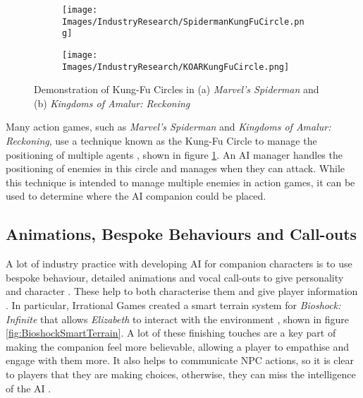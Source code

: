 \documentclass{IEEEtran}
\begin{document}
\begin{figure}
  \centering
  
  \begin{subfigure}[a]{\linewidth}
  \texttt{[image: Images/IndustryResearch/SpidermanKungFuCircle.png]}
  \end{subfigure}
  
  \begin{subfigure}[b]{\linewidth}
  \texttt{[image: Images/IndustryResearch/KOARKungFuCircle.png]}
  \end{subfigure}
  
  \caption{Demonstration of Kung-Fu Circles in (a) \textit{Marvel's Spiderman} and (b) \textit{Kingdoms of Amalur: Reckoning}}
  \label{fig:KungFuCircle}
\end{figure}

Many action games, such as \textit{Marvel's Spiderman} and \textit{Kingdoms of Amalur: Reckoning}, use a technique known as the Kung-Fu Circle to manage the positioning of multiple agents \cite{GAIPKungFuCircle, GDCSpiderman}, shown in figure \ref{fig:KungFuCircle}. An AI manager handles the positioning of enemies in this circle and manages when they can attack. While this technique is intended to manage multiple enemies in action games, it can be used to determine where the AI companion could be placed.

\subsection{Animations, Bespoke Behaviours and Call-outs}
\label{ABC}

A lot of industry practice with developing AI for companion characters is to use bespoke behaviour, detailed animations and vocal call-outs to give personality and character \cite{GMTGoodAI, GAIPOReactions}. These help to both characterise them and give player information \cite{GAIP2EllieAI}. In particular, Irrational Games created a smart terrain system for \textit{Bioshock: Infinite} that allows \textit{Elizabeth} to interact with the environment \cite{GDCElizabeth, AIGamesBioshockAI}, shown in figure \ref{fig:BioshockSmartTerrain}. A lot of these finishing touches are a key part of making the companion feel more believable, allowing a player to empathise and engage with them more. It also helps to communicate NPC actions, so it is clear to players that they are making choices, otherwise, they can miss the intelligence of the AI \cite{GMTGoodAI}.
\end{document}
